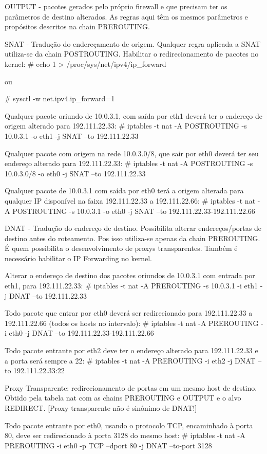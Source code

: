 OUTPUT - pacotes gerados pelo próprio firewall e que precisam ter os parâmetros de destino alterados. As regras aqui têm os mesmos parâmetros e propósitos descritos na chain PREROUTING.

SNAT - Tradução do endereçamento de origem.
Qualquer regra aplicada a SNAT utiliza-se da chain POSTROUTING.
Habilitar o redirecionamento de pacotes no kernel:
# echo 1 > /proc/sys/net/ipv4/ip_forward

ou

# sysctl -w net.ipv4.ip_forward=1

Qualquer pacote oriundo de 10.0.3.1, com saída por eth1 deverá ter o endereço de origem alterado para 192.111.22.33:
# iptables -t nat -A POSTROUTING -s 10.0.3.1 -o eth1 -j SNAT --to 192.111.22.33

Qualquer pacote com origem na rede 10.0.3.0/8, que sair por eth0 deverá ter seu endereço alterado para 192.111.22.33:
# iptables -t nat -A POSTROUTING -s 10.0.3.0/8 -o eth0 -j SNAT --to 192.111.22.33

Qualquer pacote de 10.0.3.1 com saída por eth0 terá a origem alterada para qualquer IP disponível na faixa 192.111.22.33 a 192.111.22.66:
# iptables -t nat -A POSTROUTING -s 10.0.3.1 -o eth0 -j SNAT --to 192.111.22.33-192.111.22.66

DNAT - Tradução do endereço de destino.
Possibilita alterar endereços/portas de destino antes do roteamento. Pos isso utiliza-se apenas da chain PREROUTING.
É quem possibilita o desenvolvimento de proxys transparentes.
Também é necessário habilitar o IP Forwarding no kernel.

Alterar o endereço de destino dos pacotes oriundos de 10.0.3.1 com entrada por eth1, para 192.111.22.33:
# iptables -t nat -A PREROUTING -s 10.0.3.1 -i eth1 -j DNAT --to 192.111.22.33

Todo pacote que entrar por eth0 deverá ser redirecionado para 192.111.22.33 a 192.111.22.66 (todos os hosts no intervalo):
# iptables -t nat -A PREROUTING -i eth0 -j DNAT --to 192.111.22.33-192.111.22.66

Todo pacote entrante por eth2 deve ter o endereço alterado para 192.111.22.33 e a porta será sempre a 22:
# iptables -t nat -A PREROUTING -i eth2 -j DNAT --to 192.111.22.33:22

Proxy Transparente: redirecionamento de portas em um mesmo host de destino. Obtido pela tabela nat com as chains PREROUTING e OUTPUT e o alvo REDIRECT. [Proxy transparente não é sinônimo de DNAT!]

Todo pacote entrante por eth0, usando o protocolo TCP, encaminhado à porta 80, deve ser redirecionado à porta 3128 do mesmo host:
# iptables -t nat -A PREROUTING -i eth0 -p TCP --dport 80 -j DNAT --to-port 3128

